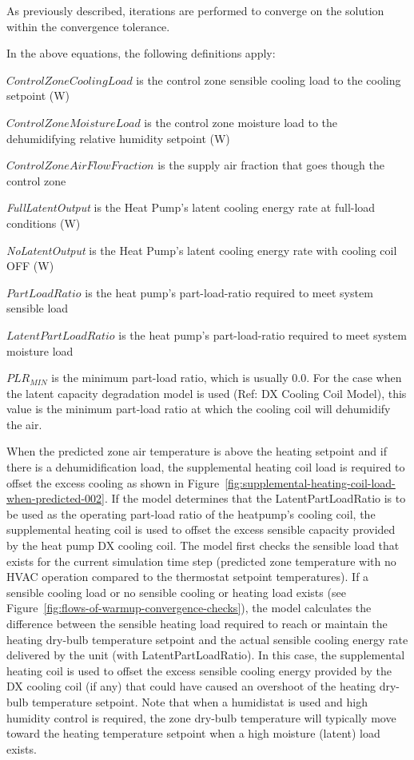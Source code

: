 As previously described, iterations are performed to converge on the solution within the convergence tolerance.

In the above equations, the following definitions apply:

\(ControlZoneCoolingLoad\) is the control zone sensible cooling load to the cooling setpoint (W)

\(ControlZoneMoistureLoad\) is the control zone moisture load to the dehumidifying relative humidity setpoint (W)

\(ControlZoneAirFlowFraction\) is the supply air fraction that goes though the control zone

\emph{FullLatentOutput} is the Heat Pump's latent cooling energy rate at full-load conditions (W)

\emph{NoLatentOutput} is the Heat Pump's latent cooling energy rate with cooling coil OFF (W)

\(PartLoadRatio\) is the heat pump's part-load-ratio required to meet system sensible load

\(LatentPartLoadRatio\) is the heat pump's part-load-ratio required to meet system moisture load

\(PL{R_{MIN}}\) is the minimum part-load ratio, which is usually 0.0. For the case when the latent capacity degradation model is used (Ref: DX Cooling Coil Model), this value is the minimum part-load ratio at which the cooling coil will dehumidify the air.

When the predicted zone air temperature is above the heating setpoint and if there is a dehumidification load, the supplemental heating coil load is required to offset the excess cooling as shown in Figure~\ref{fig:supplemental-heating-coil-load-when-predicted-002}. If the model determines that the LatentPartLoadRatio is to be used as the operating part-load ratio of the heatpump's cooling coil, the supplemental heating coil is used to offset the excess sensible capacity provided by the heat pump DX cooling coil. The model first checks the sensible load that exists for the current simulation time step (predicted zone temperature with no HVAC operation compared to the thermostat setpoint temperatures). If a sensible cooling load or no sensible cooling or heating load exists (see Figure~\ref{fig:flows-of-warmup-convergence-checks}), the model calculates the difference between the sensible heating load required to reach or maintain the heating dry-bulb temperature setpoint and the actual sensible cooling energy rate delivered by the unit (with LatentPartLoadRatio). In this case, the supplemental heating coil is used to offset the excess sensible cooling energy provided by the DX cooling coil (if any) that could have caused an overshoot of the heating dry-bulb temperature setpoint. Note that when a humidistat is used and high humidity control is required, the zone dry-bulb temperature will typically move toward the heating temperature setpoint when a high moisture (latent) load exists.

